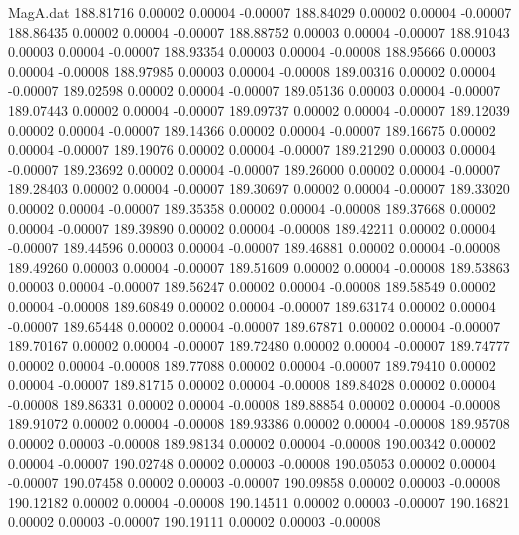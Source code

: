 \begin{filecontents}{MagA.dat}
 188.81716    0.00002    0.00004   -0.00007
 188.84029    0.00002    0.00004   -0.00007
 188.86435    0.00002    0.00004   -0.00007
 188.88752    0.00003    0.00004   -0.00007
 188.91043    0.00003    0.00004   -0.00007
 188.93354    0.00003    0.00004   -0.00008
 188.95666    0.00003    0.00004   -0.00008
 188.97985    0.00003    0.00004   -0.00008
 189.00316    0.00002    0.00004   -0.00007
 189.02598    0.00002    0.00004   -0.00007
 189.05136    0.00003    0.00004   -0.00007
 189.07443    0.00002    0.00004   -0.00007
 189.09737    0.00002    0.00004   -0.00007
 189.12039    0.00002    0.00004   -0.00007
 189.14366    0.00002    0.00004   -0.00007
 189.16675    0.00002    0.00004   -0.00007
 189.19076    0.00002    0.00004   -0.00007
 189.21290    0.00003    0.00004   -0.00007
 189.23692    0.00002    0.00004   -0.00007
 189.26000    0.00002    0.00004   -0.00007
 189.28403    0.00002    0.00004   -0.00007
 189.30697    0.00002    0.00004   -0.00007
 189.33020    0.00002    0.00004   -0.00007
 189.35358    0.00002    0.00004   -0.00008
 189.37668    0.00002    0.00004   -0.00007
 189.39890    0.00002    0.00004   -0.00008
 189.42211    0.00002    0.00004   -0.00007
 189.44596    0.00003    0.00004   -0.00007
 189.46881    0.00002    0.00004   -0.00008
 189.49260    0.00003    0.00004   -0.00007
 189.51609    0.00002    0.00004   -0.00008
 189.53863    0.00003    0.00004   -0.00007
 189.56247    0.00002    0.00004   -0.00008
 189.58549    0.00002    0.00004   -0.00008
 189.60849    0.00002    0.00004   -0.00007
 189.63174    0.00002    0.00004   -0.00007
 189.65448    0.00002    0.00004   -0.00007
 189.67871    0.00002    0.00004   -0.00007
 189.70167    0.00002    0.00004   -0.00007
 189.72480    0.00002    0.00004   -0.00007
 189.74777    0.00002    0.00004   -0.00008
 189.77088    0.00002    0.00004   -0.00007
 189.79410    0.00002    0.00004   -0.00007
 189.81715    0.00002    0.00004   -0.00008
 189.84028    0.00002    0.00004   -0.00008
 189.86331    0.00002    0.00004   -0.00008
 189.88854    0.00002    0.00004   -0.00008
 189.91072    0.00002    0.00004   -0.00008
 189.93386    0.00002    0.00004   -0.00008
 189.95708    0.00002    0.00003   -0.00008
 189.98134    0.00002    0.00004   -0.00008
 190.00342    0.00002    0.00004   -0.00007
 190.02748    0.00002    0.00003   -0.00008
 190.05053    0.00002    0.00004   -0.00007
 190.07458    0.00002    0.00003   -0.00007
 190.09858    0.00002    0.00003   -0.00008
 190.12182    0.00002    0.00004   -0.00008
 190.14511    0.00002    0.00003   -0.00007
 190.16821    0.00002    0.00003   -0.00007
 190.19111    0.00002    0.00003   -0.00008

\end{filecontents}
